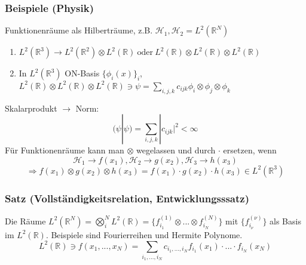 \documentclass[twoside,a4paper]{scrartcl}
\renewcommand{\1}{\mathds{1}}
\newcommand{\ra}{\rightarrow}
\begin{document}
\subsubsection*{Beispiele (Physik)}
Funktionenräume als Hilberträume, z.B. $\mathcal H_1, \mathcal H_2=L^2(\mathbb R^N)$
\begin{enumerate}
 \item $L^2(\mathbb R^3) \ra L^2(\mathbb R^2) \otimes L^2(\mathbb R) \ \mathrm{oder} \  L^2(\mathbb R) \otimes L^2(\mathbb R) \otimes L^2(\mathbb R) $ 
 \item In $L^2(\mathbb R^3)$ ON-Basis $\{ \phi_i(x)\}_i$, $L^2(\mathbb R) \otimes L^2(\mathbb R) \otimes L^2(\mathbb R) \ni \psi=\sum_{i,j,k} c_{ijk} \phi_i\otimes  \phi_j \otimes \phi_k$
\end{enumerate}
Skalarprodukt $\ra$ Norm:
$$(\psi|\psi)=\sum_{i,j,k} |c_{ijk}|^2 < \infty$$
Für Funktionenräume kann man $\otimes$ wegelassen  und durch $\cdot$ ersetzen, wenn  
$$\mathcal H_1 \ra f(x_1),\mathcal H_2 \ra g(x_2),\mathcal H_3 \ra h(x_3) $$
$$ \Rightarrow f(x_1) \otimes g(x_2) \otimes h(x_3)=f(x_1) \cdot g(x_2) \cdot h(x_3) \in L^2(\mathbb R^3)$$

\subsubsection*{Satz (Vollständigkeitsrelation, Entwicklungsssatz)}
Die Räume $L^2(\mathbb R^N)=\bigotimes_i^N L^2(\mathbb R)=\{ f_{i_1}^{(1)} \otimes ... \otimes f_{i_N}^{(N)}\}$ mit $\{f_{i_\nu}^{(\nu)}\}$ als Basis im $L^2(\mathbb R)$.
Beispiele sind Fourierreihen und Hermite Polynome.
$$L^2(\mathbb R) \ni f(x_1,...,x_N)=\sum_{i_1,...,i_N} c_{i_1,...,i_N}f_{i_1}(x_1)\cdot ... \cdot f_{i_N}(x_N)$$
\end{document}
